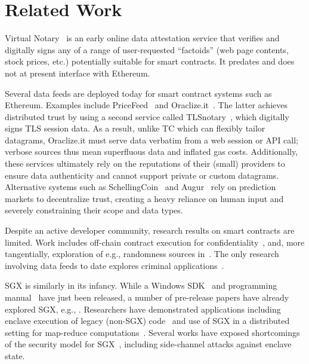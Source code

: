 \section{Related Work}
\label{sec:related}

Virtual Notary~\cite{VN:2013,VN:2016} is an early online data attestation service that verifies and digitally signs any of a range of user-requested ``factoids'' (web page contents, stock prices, etc.) potentially suitable for smart contracts. It predates and does not at present interface with Ethereum.

Several data feeds are deployed today for smart contract systems such as Ethereum. Examples include PriceFeed~\cite{PriceFeed:2016} and Oraclize.it~\cite{Oraclize:2016}. The latter achieves distributed trust by using a second service called TLSnotary~\cite{TLSnotary}, which digitally signs TLS session data. As a result, unlike TC which can flexibly tailor datagrams, Oraclize.it must serve data verbatim from a web session or API call; verbose sources thus mean superfluous data and inflated gas costs. Additionally, these services  ultimately rely on the reputations of their (small) providers to ensure data authenticity and cannot support private or custom datagrams. Alternative systems such as SchellingCoin~\cite{schellingcoin} and Augur~\cite{augur} rely on prediction markets to decentralize trust, creating a heavy reliance on human input and severely constraining their scope and data types.  


Despite an active developer community, research results on smart contracts are limited. Work includes off-chain contract execution for confidentiality~\cite{hawk}, and, more tangentially, exploration of e.g., randomness sources in~\cite{bonneau2015bitcoin}. The only research involving data feeds to date explores criminal applications~\cite{gyges}.

SGX is similarly in its infancy.
While a Windows SDK~\cite{sgxsdk} and programming manual~\cite{sgxmanual} have just been released, a number of pre-release papers have already explored SGX, e.g., \cite{VC3,7163052,anati2013innovative,McKeen:2013jv,Phegade:2013km}. Researchers have demonstrated applications including enclave execution of legacy (non-SGX) code~\cite{haven} and use of SGX in a distributed setting for map-reduce computations~\cite{VC3}. Several works have exposed shortcomings of the security model for SGX~\cite{sgxexplained,sgxsok,shihardwaretalk}, including side-channel attacks against enclave state. 


